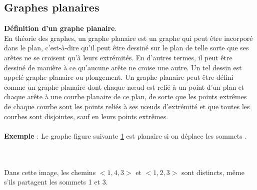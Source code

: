 \documentclass[hidelinks,letterpaper,12pt]{article}
\newcounter{Exemple} %
\begin{document}
\subsection{Graphes planaires}	
\label{Graphes planaires}
\textbf{Définition d'un graphe planaire}.\\ 
En théorie des graphes, un graphe planaire est un graphe qui peut être incorporé dans le plan, c'est-à-dire qu'il peut être dessiné sur le plan de telle sorte que ses arêtes ne se croisent qu'à leurs extrémités. En d'autres termes, il peut être dessiné de manière à ce qu'aucune arête ne croise une autre. Un tel dessin est appelé graphe planaire ou plongement. Un graphe planaire peut être défini comme un graphe planaire dont chaque nœud est relié à un point d'un plan et chaque arête à une courbe planaire de ce plan, de sorte que les points extrêmes de chaque courbe sont les points reliés à ses nœuds d'extrémité et que toutes les courbes sont disjointes, sauf en leurs points extrêmes.
\\ \\	
\textbf{Exemple} : Le graphe figure suivante \ref{Exemple d'un graphe planaire} est planaire si on déplace les sommets \citep{MathieuSablik}.
\\ \\ \\
\begin{figure}[H]
\centering	
{}
\label{Exemple d'un graphe planaire}
\end{figure}
Dans cette image, les chemins \( <1, 4, 3> \) et \( <1, 2, 3> \) sont distincts, même s'ils partagent les sommets 1 et 3.
\bigbreak  

\end{document}
